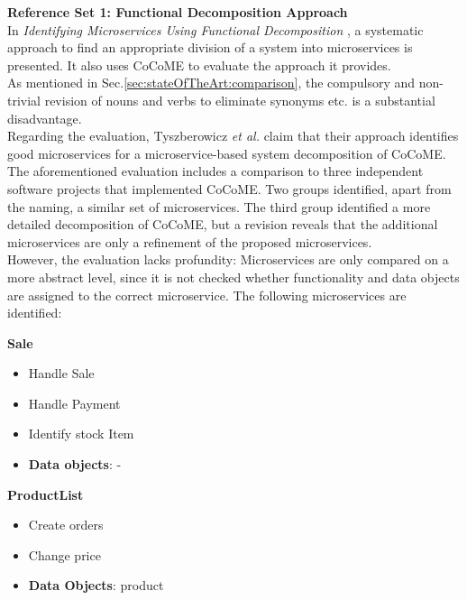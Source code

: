 \noindent
\textbf{Reference Set 1: Functional Decomposition Approach} \\
In \textit{Identifying Microservices Using Functional Decomposition} \cite{FunctionalDecompositionHeinrich}, a systematic approach to find an appropriate division of a system into microservices is presented. It also uses CoCoME to evaluate the approach it provides. \\
As mentioned in Sec.\ref{sec:stateOfTheArt:comparison}, the compulsory and non-trivial revision of nouns and verbs to eliminate synonyms etc. is a substantial disadvantage.\\
Regarding the evaluation, Tyszberowicz \textit{et al.} claim that their approach identifies good microservices for a microservice-based system decomposition of CoCoME. The aforementioned evaluation includes a comparison to three independent software projects that implemented CoCoME. Two groups identified, apart from the naming, a similar set of microservices. The third group identified a more detailed decomposition of CoCoME, but a revision reveals that the additional microservices are only a refinement of the proposed microservices. \\
However, the evaluation lacks profundity: Microservices are only compared on a more abstract level, since it is not checked whether functionality and data objects are assigned to the correct microservice. The following microservices are identified: 


\begin{multicols}{2}
	\textbf{Sale}
	\begin{flushleft}
		\begin{itemize}[noitemsep]
			\item Handle Sale
			\item Handle Payment
			\item Identify stock Item
			\item \textbf{Data objects}: -  
		\end{itemize}
	\end{flushleft}
	
	
	\vfill
	\columnbreak
	\textbf{ProductList}
	\begin{flushleft}
		\begin{itemize}[noitemsep]
			\item Create orders
			\item Change price
			\item \textbf{Data Objects}: product
			
			
		\end{itemize}
	\end{flushleft}
	
\end{multicols}




